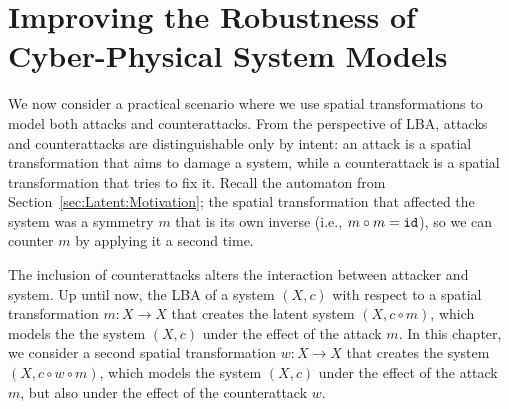  \chapter{Improving the Robustness of Cyber-Physical System Models}
 \label{ch:CPSRobustness}  
 {
 We now consider a practical scenario where we use spatial transformations to model both attacks and counterattacks. From the perspective of LBA, attacks and counterattacks are distinguishable only by intent: an attack is a spatial transformation that aims to damage a system, while a counterattack is a spatial transformation that tries to fix it. Recall the automaton from Section~\ref{sec:Latent:Motivation}; the spatial transformation that affected the system was a symmetry $m$ that is its own inverse (i.e., $m\circ m={\texttt{id}}$), so we can counter $m$ by applying it a second time. 
 
 The inclusion of counterattacks alters the interaction between attacker and system. Up until now, the LBA of a system $(X,c)$ with respect to a spatial transformation $m\colon X\rightarrow X$ that creates the latent system $(X,c\circ m)$, which models the the system $(X,c)$ under the effect of the attack $m$. In this chapter, we consider a second spatial transformation $w\colon X\rightarrow X$ that creates the system $(X, c\circ w\circ m)$, which models the system $(X,c)$ under the effect of the attack $m$, but also under the effect of the counterattack $w$.
 }
   
   
